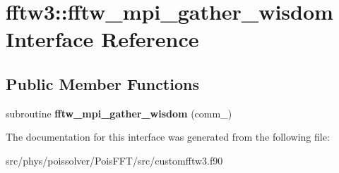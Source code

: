 \hypertarget{interfacefftw3_1_1fftw__mpi__gather__wisdom}{}\section{fftw3\+:\+:fftw\+\_\+mpi\+\_\+gather\+\_\+wisdom Interface Reference}
\label{interfacefftw3_1_1fftw__mpi__gather__wisdom}
\subsection*{Public Member Functions}
\begin{DoxyCompactItemize}
\item 
subroutine {\bfseries fftw\+\_\+mpi\+\_\+gather\+\_\+wisdom} (comm\+\_\+)\hypertarget{interfacefftw3_1_1fftw__mpi__gather__wisdom_a3874515fa545193e50e534b791ff873f}{}\label{interfacefftw3_1_1fftw__mpi__gather__wisdom_a3874515fa545193e50e534b791ff873f}

\end{DoxyCompactItemize}


The documentation for this interface was generated from the following file\+:\begin{DoxyCompactItemize}
\item 
src/phys/poissolver/\+Pois\+F\+F\+T/src/customfftw3.\+f90\end{DoxyCompactItemize}
